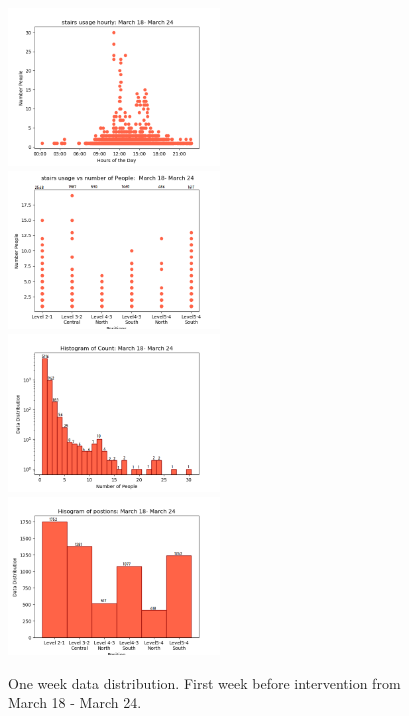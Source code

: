 \begin{figure}[!h]
    \centering
      \includegraphics[width=0.5\textwidth]{image/Chapters/Chapter6/oneWeekBeforehourly.png}\hfill
    \includegraphics[width=0.5\textwidth]{image/Chapters/Chapter6/PositionCountOneWeekBeforer.png}\hfill
    \includegraphics[width=0.5\textwidth]{image/Chapters/Chapter6/oneweekCountDistributonBefore.png}\hfill 
    \includegraphics[width=0.5\textwidth]{image/Chapters/Chapter6/oneweekBeforePositionDistributon.png}
    \caption{One week data distribution. First week before intervention from March 18 - March 24.}
    \label{55}
\end{figure}


